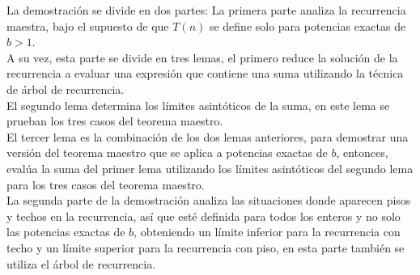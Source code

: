 \documentclass[12pt]{article}
\begin{document}
La demostración se divide en dos partes: La primera parte analiza la recurrencia maestra, bajo el supuesto de que $T(n)$ se define solo para potencias exactas de $b > 1$.\\
A su vez, esta parte se divide en tres lemas, el primero reduce la solución de la recurrencia a evaluar una expresión que contiene una suma utilizando la técnica de árbol de recurrencia.\\
El segundo lema determina los límites asintóticos de la suma, en este lema se prueban los tres casos del teorema maestro.\\
El tercer lema es la combinación de los dos lemas anteriores, para demostrar una versión del teorema maestro que se aplica a potencias exactas de $b$, entonces, evalúa la suma del primer lema utilizando los límites asintóticos del segundo lema para los tres casos del teorema maestro.\\
La segunda parte de la demostración analiza las situaciones donde aparecen pisos y techos en la recurrencia, así que esté definida para todos los enteros y no solo las potencias exactas de $b$, obteniendo un límite inferior para la recurrencia con techo y un límite superior para la recurrencia con piso, en esta parte también se utiliza el árbol de recurrencia.
\end{document}
